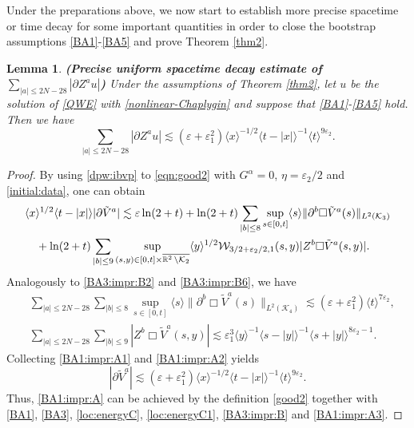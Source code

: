 \documentclass[11pt,twoside]{article}
\def\cK{\mathcal K}
\def\cW{\mathcal W}
\def\R{\mathop{\mathbb R\kern 0pt}\nolimits}
\def\ds{\displaystyle}
\def\p{\partial}
\def\ve{\varepsilon}
\def\ls{\lesssim}
\newcommand{\w}[1]{\langle {#1} \rangle}
\theoremstyle{plain}
\newtheorem{lemma}[theorem]{Lemma}
\theoremstyle{definition}
\numberwithin{equation}{section}
\begin{document}
Under the preparations above, we now start to establish more precise spacetime or time decay for some important quantities
in order to close the bootstrap assumptions \eqref{BA1}-\eqref{BA5}  and prove Theorem \ref{thm2}.
\begin{lemma}
{\bf (Precise uniform spacetime decay estimate of $\ds\sum_{|a|\le2N-28}|\p Z^au|$)}
Under the assumptions of Theorem \ref{thm2}, let $u$ be the solution of \eqref{QWE} with \eqref{nonlinear-Chaplygin}
and suppose that \eqref{BA1}-\eqref{BA5} hold.
Then we have
\begin{equation}\label{BA1:impr:A}
\sum_{|a|\le2N-28}|\p Z^au|\ls(\ve+\ve_1^2)\w{x}^{-1/2}\w{t-|x|}^{-1}\w{t}^{9\ve_2}.
\end{equation}
\end{lemma}
\begin{proof}
By using \eqref{dpw:ibvp} to \eqref{eqn:good2} with $G^{\alpha}=0$, $\eta=\ve_2/2$ and \eqref{initial:data}, one can obtain
\begin{equation}\label{BA1:impr:A1}
\begin{split}
&\w{x}^{1/2}\w{t-|x|}|\p\tilde V^a|\ls\ve\ln(2+t)
+\ln(2+t)\sum_{|b|\le8}\sup_{s\in[0,t]}\w{s}\|\p^b\Box\tilde V^a(s)\|_{L^2(\cK_3)}\\
&\quad+\ln(2+t)\sum_{|b|\le9}\sup_{(s,y)\in[0,t]\times\overline{\R^2\setminus\cK_2}}\w{y}^{1/2}\cW_{3/2+\ve_2/2,1}(s,y)|Z^b\Box\tilde V^a(s,y)|.
\end{split}
\end{equation}
Analogously to \eqref{BA3:impr:B2} and \eqref{BA3:impr:B6}, we have
\begin{equation}\label{BA1:impr:A2}
\begin{split}
&\sum_{|a|\le2N-28}\sum_{|b|\le8}\sup_{s\in[0,t]}\w{s}\|\p^b\Box\tilde V^a(s)\|_{L^2(\cK_4)}\ls(\ve+\ve_1^2)\w{t}^{7\ve_2},\\
&\sum_{|a|\le2N-28}\sum_{|b|\le9}|Z^b\Box \tilde V^a(s,y)|\ls\ve_1^3\w{y}^{-1}\w{s-|y|}^{-1}\w{s+|y|}^{8\ve_2-1}.
\end{split}
\end{equation}
Collecting \eqref{BA1:impr:A1} and \eqref{BA1:impr:A2} yields
\begin{equation}\label{BA1:impr:A3}
|\p\tilde V^a|\ls(\ve+\ve_1^2)\w{x}^{-1/2}\w{t-|x|}^{-1}\w{t}^{9\ve_2}.
\end{equation}
Thus, \eqref{BA1:impr:A} can be achieved by the definition \eqref{good2} together with \eqref{BA1}, \eqref{BA3}, \eqref{loc:energyC}, \eqref{loc:energyC1}, \eqref{BA3:impr:B} and \eqref{BA1:impr:A3}.
\end{proof}
\end{document}
